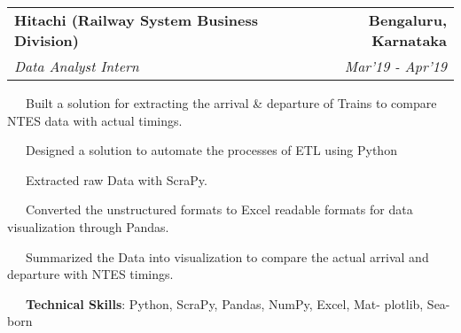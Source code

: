 \documentclass[a4paper,20pt]{article}
\makeatletter
\newcommand{\resumeSubheading}[4]{
  \vspace{-1pt}\item
    \begin{tabular*}{0.97\textwidth}{l@{\extracolsep{\fill}}r}
      \textbf{#1} & #2 \\
      \textit{#3} & \textit{#4} \\
    \end{tabular*}\vspace{-5pt}
}
\makeatother
\begin{document}
\vspace{-5pt}
    \resumeSubheading
      {\textbf{Hitachi (Railway System Business Division)}}{\textbf{Bengaluru, Karnataka}}
      {Data Analyst Intern}{Mar'19 - Apr'19}
    \resumeSubHeadingEnd
     \begin{description}[font=$\bullet$]
        \item {~~~}{Built a solution for extracting the arrival \& departure of Trains to compare NTES data with actual timings.}
        \vspace{-5pt}
        \item {~~~}{Designed a solution to automate the processes of ETL using Python}
        \vspace{-5pt}
        \item {~~~}{Extracted raw Data with ScraPy.}
        \vspace{-5pt}
        \item {~~~}{Converted the unstructured formats to Excel readable formats for data visualization through Pandas.}
        \vspace{-5pt}
        \item {~~~}{Summarized the Data into visualization to compare the actual arrival and departure with NTES timings.}
        \vspace{-5pt}
        \item {~~~}{\textbf{Technical Skills}: Python, ScraPy, Pandas, NumPy, Excel, Mat- plotlib, Sea-born}
        
    \end{description}

\vspace{-5pt}
\end{document}
